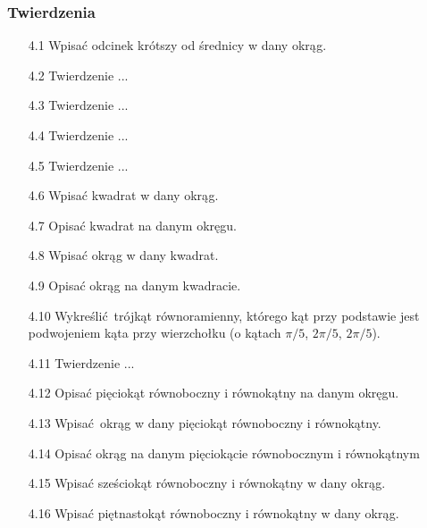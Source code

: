 \subsubsection{Twierdzenia}
\begin{enumerate}
	\item [4.1] Wpisać odcinek krótszy od średnicy w dany okrąg.
	\item [4.2] Twierdzenie ...
	\item [4.3] Twierdzenie ...
	\item [4.4] Twierdzenie ...
	\item [4.5] Twierdzenie ...
	\item [4.6] Wpisać kwadrat w dany okrąg.
	\item [4.7] Opisać kwadrat na danym okręgu.
	\item [4.8] Wpisać okrąg w dany kwadrat.
	\item [4.9] Opisać okrąg na danym kwadracie.
	\item [4.10] Wykreślić trójkąt równoramienny, którego kąt przy podstawie jest podwojeniem kąta przy wierzchołku (o kątach $\pi/5$, $2\pi/5$, $2\pi/5$).
	\item [4.11] Twierdzenie ...
	\item [4.12] Opisać pięciokąt równoboczny i równokątny na danym okręgu.
	\item [4.13] Wpisać okrąg w dany pięciokąt równoboczny i równokątny.
	\item [4.14] Opisać okrąg na danym pięciokącie równobocznym i równokątnym
	\item [4.15] Wpisać sześciokąt równoboczny i równokątny w dany okrąg.
	\item [4.16] Wpisać piętnastokąt równoboczny i równokątny w dany okrąg.
\end{enumerate}

%